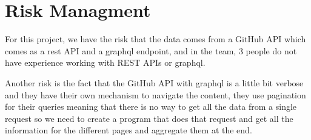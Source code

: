 \section{Risk Managment}
For this project, we have the risk that the data comes from a GitHub API which comes as a rest API and a graphql endpoint, and in the team, 3 people do not have experience working with REST APIs or graphql. \newline\newline

\noindent
Another risk is the fact that the GitHub API with graphql is a little bit verbose and they have their own mechanism to navigate the content, they use pagination for their queries meaning that there is no way to get all the data from a single request so we need to create a program that does that request and get all the information for the different pages and aggregate them at the end.

